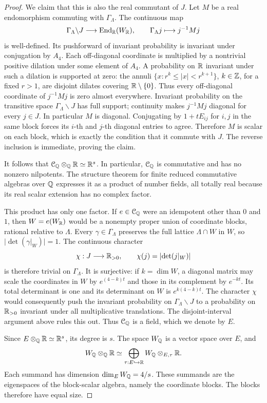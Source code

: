 \begin{proof}
We claim that this is also the real commutant of \(J\).
Let \(M\) be a real endomorphism commuting with \(\Gamma_\Lambda\).
The continuous map
\[
 \Gamma_\Lambda\backslash J\longrightarrow\operatorname{End}_\mathbb R(W_\mathbb R),
 \qquad \Gamma_\Lambda j\longmapsto j^{-1}Mj
\]
is well-defined.  Its pushforward of invariant probability is
invariant under conjugation by \(A_4\).  Each off-diagonal
coordinate is multiplied by a nontrivial positive dilation under
some element of \(A_4\).  A probability on \(\mathbb R\) invariant under
such a dilation is supported at zero: the annuli
\(\{x:r^k\le |x|<r^{k+1}\}\), \(k\in\mathbb Z\), for a fixed \(r>1\),
are disjoint dilates covering \(\mathbb R\setminus\{0\}\).
Thus every off-diagonal coordinate of \(j^{-1}Mj\) is zero almost
everywhere.  Invariant probability on the transitive space
\(\Gamma_\Lambda\backslash J\) has full support; continuity makes
\(j^{-1}Mj\) diagonal for every \(j\in J\).
In particular \(M\) is diagonal.  Conjugating by
\(1+tE_{ij}\) for \(i,j\) in the same block forces its \(i\)-th
and \(j\)-th diagonal entries to agree.  Therefore \(M\) is scalar
on each block, which is exactly the condition that it commute with
\(J\).  The reverse inclusion is immediate, proving the claim.

It follows that \(\mathcal C_\mathbb Q\otimes_\mathbb Q\mathbb R\simeq\mathbb R^s\).
In particular, \(\mathcal C_\mathbb Q\) is commutative and has no
nonzero nilpotents.  The structure theorem for finite reduced
commutative algebras over \(\mathbb Q\) expresses it as a product of
number fields, all totally real because its real scalar extension
has no complex factor.

This product has only one factor.  If
\(e\in\mathcal C_\mathbb Q\) were an idempotent other than \(0\) and \(1\),
then \(W=e(W_\mathbb R)\) would be a nonempty proper union of coordinate
blocks, rational relative to \(\Lambda\).  Every
\(\gamma\in\Gamma_\Lambda\) preserves the full lattice
\(\Lambda\cap W\) in \(W\), so
\(\lvert\det(\gamma|_W)\rvert=1\).
The continuous character
\[
 \chi:J\longrightarrow\mathbb R_{>0},\qquad
 \chi(j)=\lvert\det(j|_W)\rvert
\]
is therefore trivial on \(\Gamma_\Lambda\).
It is surjective: if \(k=\dim W\), a diagonal matrix may scale the
coordinates in \(W\) by \(e^{(4-k)t}\) and those in its complement
by \(e^{-kt}\).  Its total determinant is one and its determinant
on \(W\) is \(e^{k(4-k)t}\).
The character \(\chi\) would consequently push the invariant
probability on \(\Gamma_\Lambda\backslash J\) to a probability on
\(\mathbb R_{>0}\) invariant under all multiplicative translations.
The disjoint-interval argument above rules this out.
Thus \(\mathcal C_\mathbb Q\) is a field, which we denote by \(E\).

Since \(E\otimes_\mathbb Q\mathbb R\simeq\mathbb R^s\), its degree is \(s\).
The space \(W_\mathbb Q\) is a vector space over \(E\), and
\[
 W_\mathbb Q\otimes_\mathbb Q\mathbb R
 \simeq\bigoplus_{\tau:E\hookrightarrow\mathbb R}
                 W_\mathbb Q\otimes_{E,\tau}\mathbb R.
\]
Each summand has dimension \(\dim_E W_\mathbb Q=4/s\).
These summands are the eigenspaces of the block-scalar algebra,
namely the coordinate blocks.  The blocks therefore have equal size.
\end{proof}

